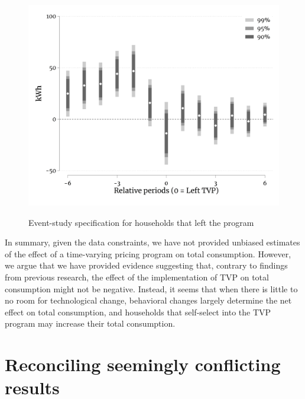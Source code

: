 \documentclass[12pt]{article}
\begin{document}
\begin{figure}[ht]
  \caption{Event-study specification for households that left the program}\label{fig:three}
  \begin{center}
  {\includegraphics[width=1\textwidth]{./figures/eventStudyType3_6months.png}}
  \end{center}
\end{figure}

In summary, given the data constraints, we have not provided unbiased estimates of the effect of a time-varying pricing program on total consumption. However, we argue that we have provided evidence suggesting that, contrary to findings from previous research, the effect of the implementation of TVP on total consumption might not be negative. Instead, it seems that when there is little to no room for technological change, behavioral changes largely determine the net effect on total consumption, and households that self-select into the TVP program may increase their total consumption.

\section{Reconciling seemingly conflicting results}
\end{document}
